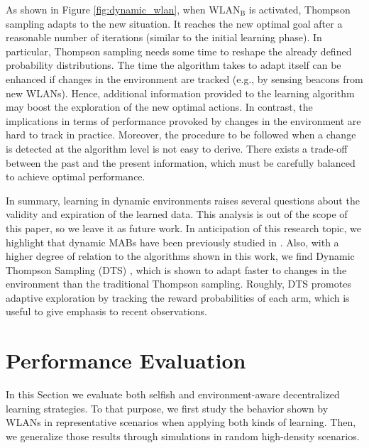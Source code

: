 \documentclass{article}
\begin{document}
As shown in Figure \ref{fig:dynamic_wlan}, when $\text{WLAN}_\text{B}$ is activated, Thompson sampling adapts to the new situation. It reaches the new optimal goal after a reasonable number of iterations (similar to the initial learning phase). In particular, Thompson sampling needs some time to reshape the already defined probability distributions. The time the algorithm takes to adapt itself can be enhanced if changes in the environment are tracked (e.g., by sensing beacons from new WLANs). Hence, additional information provided to the learning algorithm may boost the exploration of the new optimal actions. In contrast, the implications in terms of performance provoked by changes in the environment are hard to track in practice. Moreover, the procedure to be followed when a change is detected at the algorithm level is not easy to derive. There exists a trade-off between the past and the present information, which must be carefully balanced to achieve optimal performance.

In summary, learning in dynamic environments raises several questions about the validity and expiration of the learned data. This analysis is out of the scope of this paper, so we leave it as future work. In anticipation of this research topic, we highlight that dynamic MABs have been previously studied in \cite{hartland2006multi}. Also, with a higher degree of relation to the algorithms shown in this work, we find Dynamic Thompson Sampling (DTS) \cite{gupta2011thompson}, which is shown to adapt faster to changes in the environment than the traditional Thompson sampling. Roughly, DTS promotes adaptive exploration by tracking the reward probabilities of each arm, which is useful to give emphasis to recent observations.

\section{Performance Evaluation}			
\label{section:performance_evaluation}				
In this Section we evaluate both selfish and environment-aware decentralized learning strategies. To that purpose, we first study the 
behavior shown by WLANs in representative scenarios when applying both kinds of learning. Then, we generalize those results through simulations in random high-density scenarios.

\end{document}
